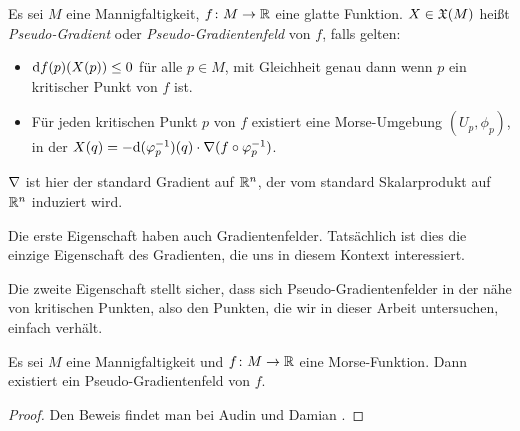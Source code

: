 \begin{definition}
    \label{def: pseudo-gradient}
    Es sei $M$ eine Mannigfaltigkeit, $f \colon M \to { \mathbb R }$ eine glatte Funktion. $X \in { \mathfrak{X} } (M)$
    heißt \textit{Pseudo-Gradient} oder \textit{Pseudo-Gradientenfeld} von $f$, falls gelten:
    \begin{itemize}
        \item ${ \operatorname{d} } f (p) (X(p)) \leq 0$ für alle $p \in M$, mit Gleichheit genau dann wenn 
            $p$ ein kritischer Punkt von $f$ ist.
        \item Für jeden kritischen Punkt $p$ von $f$ existiert eine Morse-Umgebung 
            $(U_p, \phi_p)$, in der $X (q) = 
                - { \operatorname{d} } (\varphi_p^{-1}) (q) \cdot { \nabla } (f \circ \varphi_p^{-1})$.
    \end{itemize}
    ${ \nabla }$ ist hier der standard Gradient auf ${ \mathbb R }^n$, der vom standard Skalarprodukt auf ${ \mathbb R }^n$ 
    induziert wird.
\end{definition}

Die erste Eigenschaft haben auch Gradientenfelder. Tatsächlich ist dies die einzige
Eigenschaft des Gradienten, die uns in diesem Kontext interessiert.

Die zweite Eigenschaft stellt sicher, dass sich Pseudo-Gradientenfelder in der nähe von 
kritischen Punkten, also den Punkten, die wir in dieser Arbeit untersuchen, einfach verhält.

\begin{prop}
    Es sei $M$ eine Mannigfaltigkeit und $f \colon M \to { \mathbb R }$ eine Morse-Funktion. 
    Dann existiert ein Pseudo-Gradientenfeld von $f$.
\end{prop}

\begin{proof}
    Den Beweis findet man bei Audin und Damian \cite{audin}.
\end{proof}